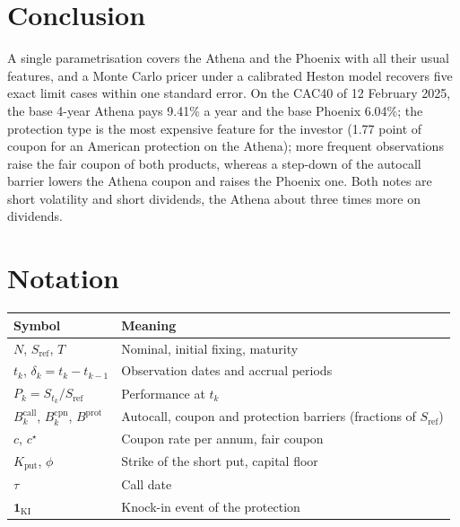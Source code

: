 \documentclass[11pt,a4paper]{article}
\newcommand{\ind}{\mathbf{1}}
\newcommand{\Sref}{S_{\mathrm{ref}}}
\begin{document}
\section{Conclusion}
A single parametrisation covers the Athena and the Phoenix with all their usual features, and a Monte Carlo pricer
under a calibrated Heston model recovers five exact limit cases within one standard error. On the CAC40 of
12 February 2025, the base 4-year Athena pays 9.41\% a year and the base Phoenix 6.04\%; the protection type is the
most expensive feature for the investor (1.77 point of coupon for an American protection on the Athena); more
frequent observations raise the fair coupon of both products, whereas a step-down of the autocall barrier lowers
the Athena coupon and raises the Phoenix one. Both
notes are short volatility and short dividends, the Athena about three times more on dividends.

\appendix
\section{Notation}
\begin{center}
\begin{tabular}{@{}ll@{}}
\toprule
Symbol & Meaning \\
\midrule
$N$, $\Sref$, $T$ & Nominal, initial fixing, maturity \\
$t_k$, $\delta_k = t_k - t_{k-1}$ & Observation dates and accrual periods \\
$P_k = S_{t_k}/\Sref$ & Performance at $t_k$ \\
$B^{\mathrm{call}}_k$, $B^{\mathrm{cpn}}_k$, $B^{\mathrm{prot}}$ & Autocall, coupon and protection barriers (fractions of $\Sref$) \\
$c$, $c^\star$ & Coupon rate per annum, fair coupon \\
$K_{\mathrm{put}}$, $\phi$ & Strike of the short put, capital floor \\
$\tau$ & Call date \\
$\ind_{\mathrm{KI}}$ & Knock-in event of the protection \\
\bottomrule
\end{tabular}
\end{center}
\end{document}
